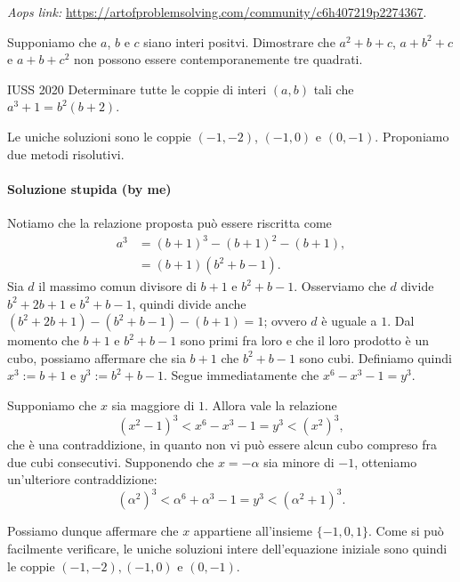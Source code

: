 \documentclass{article}
\begin{document}
\vspace{0.5cm}
\textit{Aops link:}
\href{https://artofproblemsolving.com/community/c6h407219p2274367}
{https://artofproblemsolving.com/community/c6h407219p2274367}.

\begin{proposition}{}{}
	Supponiamo che $a$, $b$ e $c$ siano interi positvi. Dimostrare che
	$a^2+b+c$, $a+b^2+c$ e $a+b+c^2$ non possono essere contemporanemente
	tre quadrati.
\end{proposition}


\begin{proposition}{IUSS 2020}{}
	Determinare tutte le coppie di interi $(a,b)$ tali che $a^3+1=b^2(b+2)$.
\end{proposition}

Le uniche soluzioni sono le coppie $(-1,-2)$, $(-1,0)$ e $(0,-1)$.
Proponiamo due metodi risolutivi.

\paragraph{Soluzione stupida (by me)}

Notiamo che la relazione proposta può essere riscritta come
\begin{align*}
	a^3 &= (b+1)^3-(b+1)^2-(b+1), \\
		 &= (b+1)(b^2+b-1).
\end{align*}
Sia $d$ il massimo comun divisore di $b+1$ e $b^2+b-1$.
Osserviamo che $d$ divide
$b^2+2b+1$ e $b^2+b-1$, quindi divide anche $(b^2+2b+1)-(b^2+b-1)-(b+1)=1$;
ovvero $d$ è uguale a $1$.
Dal momento che $b+1$ e $b^2+b-1$ sono primi fra loro e che il loro prodotto
è un cubo, possiamo affermare che sia $b+1$ che $b^2+b-1$ sono cubi.
Definiamo quindi
$x^3:=b+1$ e $y^3:=b^2+b-1$. Segue immediatamente che $x^6-x^3-1=y^3$.

Supponiamo che $x$ sia maggiore di $1$. Allora vale la relazione
\begin{equation*}
	(x^2-1)^3 < x^6-x^3-1=y^3 < (x^2)^3,
\end{equation*}
che è una contraddizione, in quanto non vi può essere alcun cubo compreso
fra due cubi consecutivi. Supponendo che $x=-\alpha$ sia
minore di $-1$, otteniamo un'ulteriore contraddizione:
\begin{equation*}
	(\alpha^2)^3 < \alpha^6 + \alpha^3 -1=y^3 < (\alpha^2+1)^3.
\end{equation*}

Possiamo dunque affermare che $x$ appartiene all'insieme $\{ -1,0,1 \}$.
Come si può facilmente verificare,
le uniche soluzioni intere dell'equazione iniziale sono quindi le coppie
$(-1,-2),(-1,0)$ e $(0,-1)$.
\end{document}
